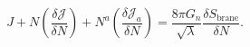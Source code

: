\begin{equation}
J + N\left(\frac{\delta \mathcal{J}}{\delta N}\right)
  +N^a \left(\frac{\delta \mathcal{J}_a}{\delta N}\right)
  =\frac{8 \pi G_n}{\sqrt{\lambda}}\frac{\delta S_\textrm{brane}}
  {\delta N}.
\end{equation}

